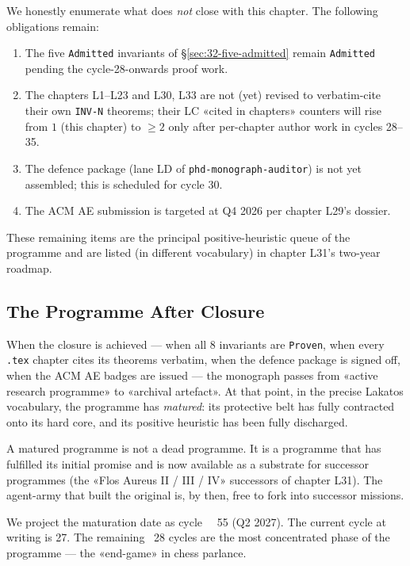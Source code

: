 We honestly enumerate what does \emph{not} close with this chapter. The
following obligations remain:
\begin{enumerate}
    \item The five \texttt{Admitted} invariants of §\ref{sec:32-five-admitted}
          remain \texttt{Admitted} pending the cycle-28-onwards proof work.
    \item The chapters L1–L23 and L30, L33 are not (yet) revised to verbatim-cite
          their own \texttt{INV-N} theorems; their LC «cited in chapters»
          counters will rise from $1$ (this chapter) to $\geq 2$ only after
          per-chapter author work in cycles 28–35.
    \item The defence package (lane LD of \texttt{phd-monograph-auditor})
          is not yet assembled; this is scheduled for cycle 30.
    \item The ACM AE submission is targeted at Q4 2026 per chapter L29's
          dossier.
\end{enumerate}

These remaining items are the principal positive-heuristic queue of the
programme and are listed (in different vocabulary) in chapter L31's
two-year roadmap.

\subsection{The Programme After Closure}
\label{sec:32-after-closure}

When the closure is achieved — when all 8 invariants are \texttt{Proven},
when every \texttt{.tex} chapter cites its theorems verbatim, when the
defence package is signed off, when the ACM AE badges are issued — the
monograph passes from «active research programme» to «archival artefact».
At that point, in the precise Lakatos vocabulary, the programme has
\emph{matured}: its protective belt has fully contracted onto its hard core,
and its positive heuristic has been fully discharged.

A matured programme is not a dead programme. It is a programme that has
fulfilled its initial promise and is now available as a substrate for
successor programmes (the «Flos Aureus II / III / IV» successors of
chapter L31). The agent-army that built the original is, by then, free to
fork into successor missions.

We project the maturation date as cycle ~~55 (Q2 2027). The current cycle
at writing is 27. The remaining ~28 cycles are the most concentrated
phase of the programme — the «end-game» in chess parlance.

